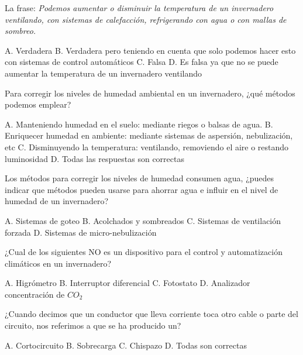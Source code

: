 \documentclass[answers,11pt]{exam}
\begin{document}
{\begin{questions}
  \question La frase: \emph{Podemos aumentar o disminuir la  temperatura de un
      invernadero ventilando, con sistemas de calefacción, refrigerando con
      agua o con mallas de sombreo.}
    \begin{checkboxes}
      \CorrectChoice A. Verdadera
      \choice B. Verdadera pero teniendo en cuenta que solo podemos hacer esto
      con sistemas de control automáticos
      \choice C. Falsa
      \choice D. Es falsa ya que no se puede aumentar la temperatura de un invernadero ventilando
    \end{checkboxes}

  \question Para corregir los niveles de humedad ambiental en un invernadero,
    ¿qué métodos podemos emplear?
    \begin{checkboxes}
      \choice A. Manteniendo humedad en el suelo: mediante riegos o balsas de
      agua.
      \choice B. Enriquecer humedad en ambiente: mediante sistemas de aspersión,
      nebulización, etc
      \choice C. Disminuyendo la temperatura: ventilando, removiendo el aire o restando
      luminosidad
      \CorrectChoice D. Todas las respuestas son correctas
    \end{checkboxes}

  \question Los métodos para corregir los niveles de humedad consumen agua,
    ¿puedes indicar que métodos pueden usarse para ahorrar agua e influir en el
    nivel de humedad de un invernadero?
    \begin{checkboxes}
      \choice A. Sistemas de goteo
      \CorrectChoice B. Acolchados y sombreados
      \choice C. Sistemas de ventilación forzada
      \choice D. Sistemas de micro-nebulización
    \end{checkboxes}

  \question ¿Cual de los siguientes NO es un dispositivo para el control y automatización
    climáticos en un invernadero?
    \begin{checkboxes}
      \choice A. Higrómetro
      \CorrectChoice B. Interruptor diferencial
      \choice C. Fotostato
      \choice D. Analizador concentración de $CO_2$
    \end{checkboxes}

  \question ¿Cuando decimos que un conductor que lleva corriente toca otro cable
    o parte del circuito, nos referimos a que se ha producido un?
    \begin{checkboxes}
      \CorrectChoice A. Cortocircuito
      \choice B. Sobrecarga
      \choice C. Chispazo
      \choice D. Todas son correctas
    \end{checkboxes}


\end{questions}}
\end{document}
